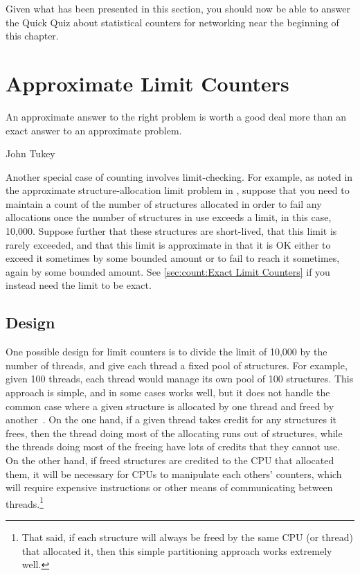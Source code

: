 Given what has been presented in this section, you should now be able
to answer the Quick Quiz about statistical counters for networking
near the beginning of this chapter.

\section{Approximate Limit Counters}
\label{sec:count:Approximate Limit Counters}
%
\epigraph{An approximate answer to the right problem is worth a good deal
	  more than an exact answer to an approximate problem.}
	 {John Tukey}

Another special case of counting involves limit-checking.
For example, as noted in the approximate structure-allocation limit
problem in \QuickQuizRef{\QcountQapproxcnt},
suppose that you need to maintain a count of the number of
structures allocated in order to fail any allocations once the number
of structures in use exceeds a limit, in this case, 10,000.
Suppose further that these structures are short-lived, that this
limit is rarely exceeded, and that this limit is approximate in
that it is OK either to exceed it sometimes by some bounded amount
or to fail to reach it sometimes, again by some bounded amount.
See \cref{sec:count:Exact Limit Counters}
if you instead need the limit to be exact.

\subsection{Design}

One possible design for limit counters is to divide the limit of 10,000
by the number of threads, and give each thread a fixed pool of structures.
For example, given 100 threads, each thread would manage its own pool
of 100 structures.
This approach is simple, and in some cases works well, but it does not
handle the common case where a given structure is allocated by one
thread and freed by another~\cite{McKenney93}.
On the one hand, if a given thread takes credit for any structures it
frees, then the thread doing most of the allocating runs out
of structures, while the threads doing most of the freeing have lots
of credits that they cannot use.
On the other hand, if freed structures are credited to the CPU that
allocated them, it will be necessary for CPUs to manipulate each
others' counters, which will require expensive  instructions
or other means of communicating between threads.\footnote{
	That said, if each structure will always be freed
	by the same CPU (or thread) that allocated it, then
	this simple partitioning approach works extremely well.}

